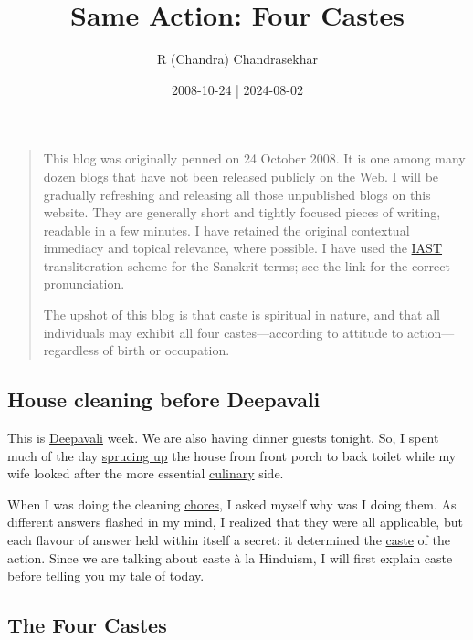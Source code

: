\documentclass[
  a4paper,
]{article}
\title{Same Action: Four Castes}
\author{R (Chandra) Chandrasekhar}
\date{2008-10-24 | 2024-08-02}
\begin{document}
\maketitle

\thispagestyle{empty}


\begin{quote}
This blog was originally penned on 24 October 2008. It is one among many
dozen blogs that have not been released publicly on the Web. I will be
gradually refreshing and releasing all those unpublished blogs on this
website. They are generally short and tightly focused pieces of writing,
readable in a few minutes. I have retained the original contextual
immediacy and topical relevance, where possible. I have used the
\href{https://en.wikipedia.org/wiki/International_Alphabet_of_Sanskrit_Transliteration}{IAST}
transliteration scheme for the Sanskrit terms; see the link for the
correct pronunciation.

The upshot of this blog is that caste is spiritual in nature, and that
all individuals may exhibit all four castes---according to attitude to
action---regardless of birth or occupation.
\end{quote}

\subsection{House cleaning before
Deepavali}\label{house-cleaning-before-deepavali}

This is \href{https://en.wikipedia.org/wiki/Diwali}{Deepavali} week. We
are also having dinner guests tonight. So, I spent much of the day
\href{https://dictionary.cambridge.org/dictionary/english/spruce-up}{sprucing
up} the house from front porch to back toilet while my wife looked after
the more essential
\href{https://www.thefreedictionary.com/culinary}{culinary} side.

When I was doing the cleaning
\href{https://www.oxfordlearnersdictionaries.com/definition/english/chore}{chores},
I asked myself why was I doing them. As different answers flashed in my
mind, I realized that they were all applicable, but each flavour of
answer held within itself a secret: it determined the
\href{https://www.thefreedictionary.com/caste}{caste} of the action.
Since we are talking about caste à la Hinduism, I will first explain
caste before telling you my tale of today.

\subsection{The Four Castes}\label{the-four-castes}
\end{document}
